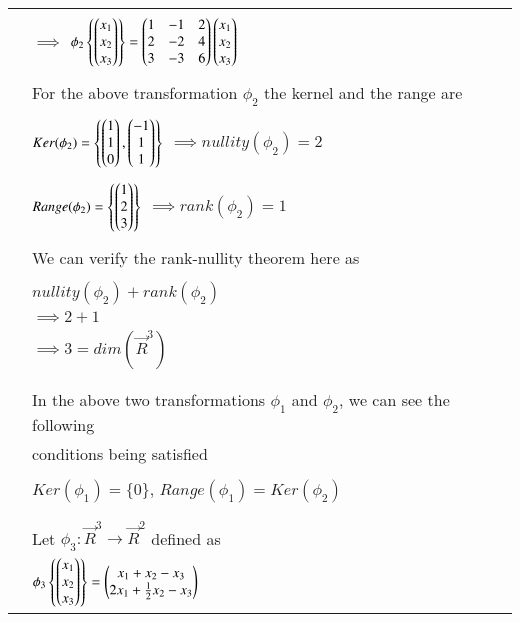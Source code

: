 \begin{longtable}{|l|l|}
		& \\
		& \qquad \qquad $\implies$ $\phi_2 \left\{ \begin{pmatrix}x_1 \\ x_2 \\ x_3\end{pmatrix}\right\} = \begin{pmatrix}1&-1&2 \\ 2&-2&4 \\ 3&-3&6\end{pmatrix}\begin{pmatrix}x_1 \\ x_2 \\ x_3\end{pmatrix}$\\
		& \\
		& For the above transformation $\phi_2$ the kernel and the range are \\
		& \\
		& \qquad \qquad $Ker(\phi_2) = \left\{ \begin{pmatrix}1 \\ 1 \\ 0\end{pmatrix}, \begin{pmatrix}-1 \\ 1 \\ 1\end{pmatrix}\right\}$ \qquad $\implies nullity(\phi_2) = 2$\\
		& \\
		& \qquad \qquad $Range(\phi_2) = \left\{\begin{pmatrix}1 \\ 2 \\ 3\end{pmatrix}\right\}$  \qquad $\implies rank(\phi_2) = 1$\\
		& \\
		& We can verify the rank-nullity theorem here as \\
		& \\
		& \qquad \qquad \qquad $nullity(\phi_2) + rank(\phi_2)$ \\
		& \qquad \qquad $\implies 2 + 1$ \\
		& \qquad \qquad $\implies 3 = dim(\vec{R}^{3})$ \\
		& \\
		& \\
		& In the above two transformations $\phi_1$ and $\phi_2$, we can see the following \\
		& conditions being satisfied \\
		& \\
		& \qquad \qquad \qquad $Ker(\phi_1) = \{0\}$, $Range(\phi_1) = Ker(\phi_2)$ \\
		& \\
		& \\
		& Let $\phi_3 : \vec{R}^{3} \rightarrow \vec{R}^{2}$ defined as \\ 
		& \qquad \qquad \qquad $\phi_3 \left\{ \begin{pmatrix}x_1 \\ x_2 \\ x_3\end{pmatrix}\right\} = \begin{pmatrix}x_1 + x_2 - x_3 \\ 2x_1 + \frac{1}{2}x_2 - x_3\end{pmatrix}$ \qquad \qquad \\

\end{longtable}
